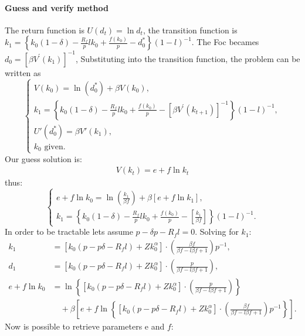 \documentclass[12pt]{article}
\begin{document}
\paragraph{Guess and verify method}
The return function is \(U(d_t)=\ln{d_t}\), the transition function is \(k_1 = \left\{k_0(1 - \delta) - \frac{R_f}{p} l k_0  
+ \frac{f(k_0)}{p} - d^*_0\right\}{\left(1-l\right)}^{-1}\). The Foc becames \( d_0=\left[\beta
V^{\prime}(k_{1})\right]^{-1}\), Substituting into the transition function, the problem can be written as
\begin{equation}
    \left\{
    \begin{array}{l}
        V\left(k_0\right) = \ln\left(d_0^*\right) + \beta V\left(k_0\right), \\
        k_1 = \left\{k_0(1 - \delta) - \frac{R_f}{p} l k_0  
+ \frac{f(k_0)}{p} - \left[\beta
V^{\prime}(k_{t+1})\right]^{-1} \right\}{\left(1-l\right)}^{-1}, \\ 
        U'\left(d_0^*\right) = \beta V'\left(k_1\right), \\
        k_0 \text{ given.} 
    \end{array}
    \right.
\end{equation}
Our guess solution is:
\begin{equation}
    \begin{gathered}
        V(k_t) = e + f \ln{k_t}
    \end{gathered}
\end{equation}
thus:
\begin{equation}
    \left\{
    \begin{array}{l}
        e + f \ln{k_0} = \ln{\left(\frac{k_1}{\beta f}\right)} + \beta \left[e + f \ln{k_1}\right], \\
        k_1 = \left\{k_0(1 - \delta) - \frac{R_f}{p} l k_0  
+ \frac{f(k_0)}{p} - \left[
\frac{k_1}{\beta f}\right] \right\}{\left(1-l\right)}^{-1}.
    \end{array}
    \right.
\end{equation}
In order to be tractable lets assume \(p - \delta p - R_f l=0\).
Solving for \(k_1\):
\begin{align}
    k_1 &= \left[k_0\left(p-p\delta-R_f l\right)+ Zk_0^{\alpha}\right]\cdot \left(\frac{ \beta f}{\beta f - l\beta f +1}\right)p^{-1},\\
    d_1 &= \left[k_0\left(p-p\delta-R_f l\right) + Zk_0^{\alpha}\right]\cdot \left(\frac{p}{\beta f - l\beta f +1}\right),\\
    e + f \ln k_0 &= \ln \left\{\left[k_0\left(p-p\delta-R_f l\right) + Zk_0^{\alpha}\right]\cdot \left(\frac{p}{\beta f - l\beta f +1}\right)\right\} \nonumber \\
    &\quad + \beta \left[e + f \ln \left\{\left[k_0\left(p-p\delta-R_f l\right) + Zk_0^{\alpha}\right]\cdot \left(\frac{ \beta f}{\beta f - l\beta f +1}\right)p^{-1}\right\}\right].
\end{align}
Now is possible to retrieve parameters e and \(f\):
\end{document}
